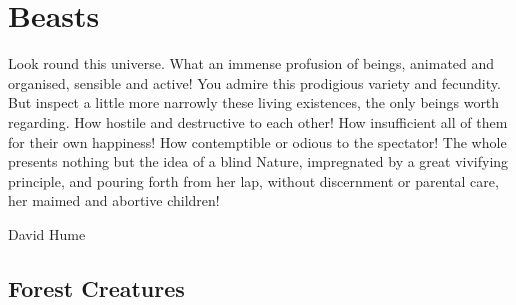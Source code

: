 \chapter{Beasts}
\label{bestiary}

\epigraph{Look round this universe. What an immense profusion of beings, animated and organised, sensible and active! You admire this prodigious variety and fecundity. But inspect a little more narrowly these living existences, the only beings worth regarding. How hostile and destructive to each other! How insufficient all of them for their own happiness! How contemptible or odious to the spectator! The whole presents nothing but the idea of a blind Nature, impregnated by a great vivifying principle, and pouring forth from her lap, without discernment or parental care, her maimed and abortive children!}{David Hume}


\section[Forest Creatures]{Forest Creatures \A}

